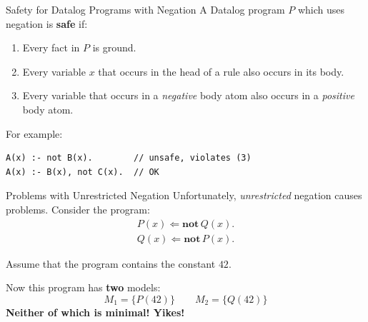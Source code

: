 \begin{frame}[fragile]{Safety for Datalog Programs with Negation}
A Datalog program $P$ which uses negation is \textbf{safe} if:
\begin{enumerate}
    \item Every fact in $P$ is ground.
    \item Every variable $x$ that occurs in the head of a rule also occurs in
    its body.
    \item Every variable that occurs in a \emph{negative} body atom also occurs
    in a \emph{positive} body atom.
\end{enumerate}

For example:
\begin{lstlisting}[language=flix,xleftmargin=0.8cm]
A(x) :- not B(x).        // unsafe, violates (3)
A(x) :- B(x), not C(x).  // OK
\end{lstlisting}
\end{frame}

\begin{frame}{Problems with Unrestricted Negation}
Unfortunately, \emph{unrestricted} negation causes problems. Consider the program:
%
\begin{align*}
P(x) \Leftarrow \textbf{not} \, Q(x). \\ 
Q(x) \Leftarrow \textbf{not} \, P(x).
\end{align*}

Assume that the program contains the constant $42$. 

Now this program has \textbf{two} models:
%
$$
    M_1 = \{ P(42) \} \qquad M_2 = \{ Q(42) \}
$$
%
\textbf{Neither of which is minimal! Yikes!}
\end{frame}

